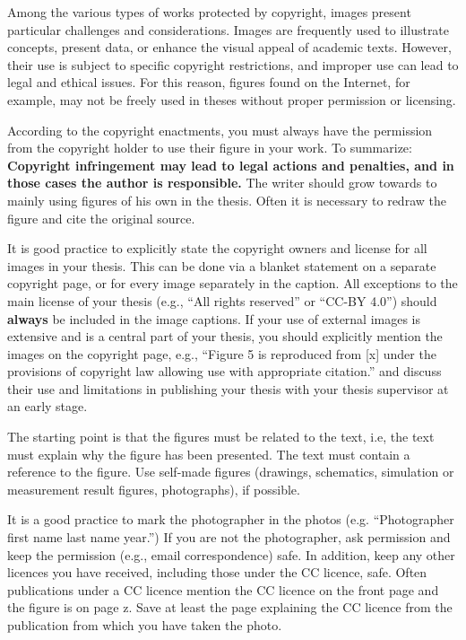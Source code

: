 Among the various types of works protected by copyright, images present particular challenges and considerations. Images are frequently used to illustrate concepts, present data, or enhance the visual appeal of academic texts. However, their use is subject to specific copyright restrictions, and improper use can lead to legal and ethical issues.
For this reason, figures found on the Internet, for example, may not be freely used in theses without proper permission or licensing. 

According to the copyright enactments, you must always have the
permission from the copyright holder to use their figure in your
work. To summarize: \textbf{Copyright infringement may lead to legal
  actions and penalties, and in those cases the author is
  responsible.} The writer should grow towards to mainly using figures
of his own in the thesis. Often it is necessary to redraw the figure
and cite the original source.

It is good practice to explicitly state the copyright owners and
license for all images in your thesis. This can be done via a blanket
statement on a separate copyright page, or for every image separately
in the caption. All exceptions to the main license of your thesis
(e.g., \enquote{All rights reserved} or \enquote{CC-BY 4.0}) should \textbf{always} be
included in the image captions. If your use of external images is extensive and is a central part of your thesis, you should explicitly mention 
the images on the copyright page, e.g., \enquote{Figure 5 is reproduced from [x] under the provisions of copyright law allowing use with appropriate citation.}
and discuss their use and limitations in publishing your thesis with your thesis supervisor at an early stage.

The starting point is that the figures must be related to the text,
i.e, the text must explain why the figure has been presented. The text
must contain a reference to the figure. Use self-made figures
(drawings, schematics, simulation or measurement result figures,
photographs), if possible.

It is a good practice to mark the photographer in the photos
(e.g. “Photographer first name last name year.”) If you are not the
photographer, ask permission and keep the permission (e.g., email
correspondence) safe. In addition, keep any other licences you have
received, including those under the CC licence, safe. Often
publications under a CC licence mention the CC licence on the front
page and the figure is on page z. Save at least the page explaining
the CC licence from the publication from which you have taken the
photo.

